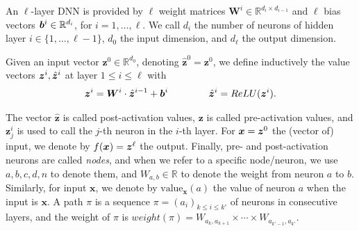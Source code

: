 \documentclass{article} %
\newcommand{\val}{{\textrm{value}}}
\theoremstyle{definition}
\begin{document}


An $\ell$-layer DNN is provided by $\ell$ weight matrices 
$\boldsymbol{W}^i \in \mathbb{R}^{d_i\times d_{i-1}}$
and $\ell$ bias vectors ${\bm{b}}^i \in \mathbb{R}^{d_i}$, for $i=1, \ldots, \ell$.
We call $d_i$ the number of neurons of hidden layer $i \in \{1, \ldots, \ell-1\}$,
$d_0$ the input dimension, and $d_\ell$ the output dimension.

Given an input vector $\boldsymbol{z}^0 \in \mathbb{R}^{d_0}$, 
denoting $\hat{\boldsymbol{z}}^{0}={\boldsymbol{z}}^0$, we define inductively the value vectors $\boldsymbol{z}^i,\hat{{\bm{z}}}^i$ at layer $1 \leq i \leq \ell$ with
\begin{align*}
	\boldsymbol{z}^{i} = \boldsymbol{W}^i\cdot \hat{\boldsymbol{z}}^{i-1}+ {\bm{b}}^i \qquad \, \qquad
	\hat{\boldsymbol{z}}^{i} = ReLU({\boldsymbol{z}}^i).
\end{align*} 

The vector $\hat{\boldsymbol{z}}$ is called post-activation values, 
$\boldsymbol{z}$ is called pre-activation values, 
and $\boldsymbol{z}^{i}_j$ is used to call the $j$-th neuron in the $i$-th layer. 
For $\boldsymbol{x}={\bm{z}}^0$ the (vector of) input, we denote by $f(\boldsymbol{x})={\bm{z}}^\ell$ the output. Finally, pre- and post-activation neurons are called \emph{nodes}, and when we refer to a specific node/neuron, we use $a,b,c,d,n$ to denote them, and $W_{a,b} \in \mathbb{R}$ to denote the weight from neuron $a$ to $b$. Similarly, for input $\boldsymbol{x}$, we denote by $\val_{\boldsymbol{x}}(a)$ the value of neuron $a$ when the input is $\boldsymbol{x}$. A path $\pi$ is a sequence $\pi=(a_i)_{k \leq  i \leq k'}$ of neurons in consecutive layers, and the weight of $\pi$ is 
$weight(\pi)=W_{a_k,a_{k+1}} \times \cdots \times  W_{a_{k'-1},a_{k'}}$.
\end{document}
